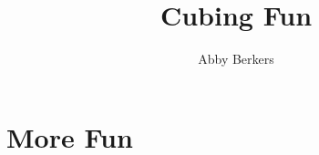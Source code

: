 \documentclass{book}
\title{Cubing Fun}
\author{Abby Berkers}
\begin{document}
    \maketitle
    \clearpage

    \tableofcontents
    \clearpage

    

    

    \chapter{More Fun}
    

    
    
\end{document}
